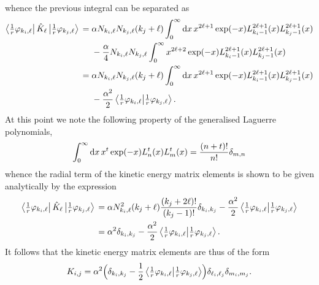 \documentclass[]{article}
\begin{document}
whence the previous integral can be separated as
\begin{alignat*}{2}
  \bra{\tfrac{1}{r}\varphi_{k_{i}, \ell}}
  \hat{K}_{\ell}
  \ket{\tfrac{1}{r}\varphi_{k_{j}, \ell}}
  {}={}
  &
  \alpha
  N_{k_{i}, \ell}
  N_{k_{j}, \ell}
  \lr{k_{j} + \ell}
  \int_{0}^{\infty}
  \dd{x}
  x^{2\ell + 1}
  \exponential\lr{-x}
  L_{k_{i} - 1}^{2 \ell + 1}\lr{x}
  L_{k_{j} - 1}^{2 \ell + 1}\lr{x}
  \\
  &
  {}-{}
  \dfrac{\alpha}{4}
  N_{k_{i}, \ell}
  N_{k_{j}, \ell}
  \int_{0}^{\infty}
  x^{2\ell + 2}
  \exponential\lr{-x}
  L_{k_{i} - 1}^{2 \ell + 1}\lr{x}
  L_{k_{j} - 1}^{2 \ell + 1}\lr{x}
  \\
  {}={}
  &
  \alpha
  N_{k_{i}, \ell}
  N_{k_{j}, \ell}
  \lr{k_{j} + \ell}
  \int_{0}^{\infty}
  \dd{x}
  x^{2\ell + 1}
  \exponential\lr{-x}
  L_{k_{i} - 1}^{2 \ell + 1}\lr{x}
  L_{k_{j} - 1}^{2 \ell + 1}\lr{x}
  \\
  &
  {}-{}
  \dfrac{\alpha^{2}}{2}
  \bra{\tfrac{1}{r}\varphi_{k_{i}, \ell}}
  \ket{\tfrac{1}{r}\varphi_{k_{j}, \ell}}
  .
\end{alignat*}
At this point we note the following property of the generalised Laguerre
polynomials,
\begin{equation*}
  \int_{0}^{\infty}
  \dd{x}
  x^{t}
  \exponential\lr{-x}
  L_{n}^{t}\lr{x}
  L_{m}^{t}\lr{x}
  =
  \dfrac
  {
    \lr{n + t}!
  }
  {
    n!
  }
  \delta_{m, n}
\end{equation*}
whence the radial term of the kinetic energy matrix elements is shown to be
given analytically by the expression
\begin{alignat*}{2}
  \bra{\tfrac{1}{r}\varphi_{k_{i}, \ell}}
  \hat{K}_{\ell}
  \ket{\tfrac{1}{r}\varphi_{k_{j}, \ell}}
  {}={}
  &
  \alpha
  N_{k_{i}, \ell}^{2}
  \lr{k_{j} + \ell}
  \dfrac
  {
    \lr{k_{j} + 2\ell}!
  }
  {
    \lr{k_{j} - 1}!
  }
  \delta_{k_{i}, k_{j}}
  -
  \dfrac{\alpha^{2}}{2}
  \bra{\tfrac{1}{r}\varphi_{k_{i}, \ell}}
  \ket{\tfrac{1}{r}\varphi_{k_{j}, \ell}}
  \\
  {}={}
  &
  \alpha^{2}
  \delta_{k_{i}, k_{j}}
  -
  \dfrac{\alpha^{2}}{2}
  \bra{\tfrac{1}{r}\varphi_{k_{i}, \ell}}
  \ket{\tfrac{1}{r}\varphi_{k_{j}, \ell}}
  .
\end{alignat*}
It follows that the kinetic energy matrix elements are thus of the form
\begin{equation*}
  K_{i, j}
  =
  \alpha^{2}
  \lr[\Big]
  {
    \delta_{k_{i}, k_{j}}
    -
    \dfrac{1}{2}
    \bra{\tfrac{1}{r}\varphi_{k_{i}, \ell}}
    \ket{\tfrac{1}{r}\varphi_{k_{j}, \ell}}
  }
  \delta_{\ell_{i}, \ell_{j}}
  \delta_{m_{i}, m_{j}}
  .
\end{equation*}
\end{document}
